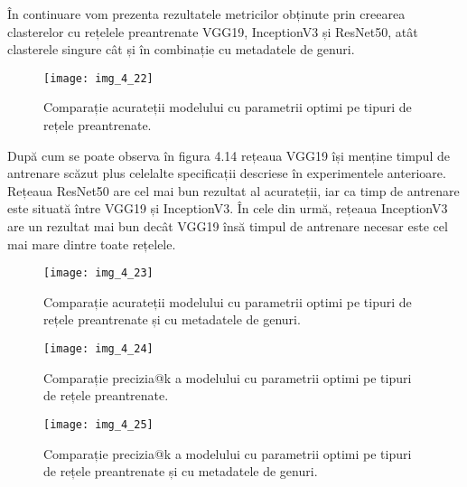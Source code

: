 În continuare vom prezenta rezultatele metricilor obținute prin creearea clasterelor cu rețelele preantrenate VGG19, InceptionV3 și ResNet50, atât clasterele singure cât și în combinație cu metadatele de genuri.
\begin{figure}[!h]
	\centering
	\texttt{[image: img\_4\_22]}
	\caption[Comparație acurateții modelului cu parametrii optimi pe tipuri de rețele preantrenate]{Comparație acurateții modelului cu parametrii optimi pe tipuri de rețele preantrenate.}
\end{figure}
După cum se poate observa în figura 4.14 rețeaua VGG19 își menține timpul de antrenare scăzut plus celelalte specificații descriese în experimentele anterioare. Rețeaua ResNet50 are cel mai bun rezultat al acurateții, iar ca timp de antrenare este situată între VGG19 și InceptionV3. În cele din urmă, rețeaua InceptionV3 are un rezultat mai bun decât VGG19 însă timpul de antrenare necesar este cel mai mare dintre toate rețelele.

\begin{figure}[!h]
	\centering
	\texttt{[image: img\_4\_23]}
	\caption[Comparație acurateții modelului cu parametrii optimi pe tipuri de rețele preantrenate și cu metadatele de genuri]{Comparație acurateții modelului cu parametrii optimi pe tipuri de rețele preantrenate și cu metadatele de genuri.}
\end{figure}

\begin{figure}[!h]
	\centering
	\texttt{[image: img\_4\_24]}
	\caption[Comparație precizia@k a modelului cu parametrii optimi pe tipuri de rețele preantrenate]{Comparație precizia@k a modelului cu parametrii optimi pe tipuri de rețele preantrenate.}
\end{figure}

\begin{figure}[!h]
	\centering
	\texttt{[image: img\_4\_25]}
	\caption[Comparație precizia@k a modelului cu parametrii optimi pe tipuri de rețele preantrenate și cu metadatele de genuri]{Comparație precizia@k a modelului cu parametrii optimi pe tipuri de rețele preantrenate și cu metadatele de genuri.}
\end{figure}